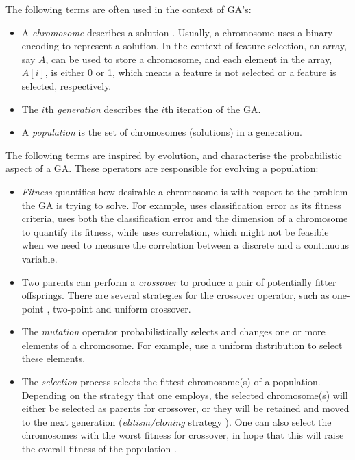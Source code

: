 \documentclass[12pt, twoside, a4paper]{report}
\begin{document}
The following terms are often used in the context of GA's:
\begin{itemize}
  \item A \textit{chromosome} describes a solution \cite{RefWorks:205}. Usually, a chromosome uses a binary encoding to represent a solution. In the context of feature selection, an array, say $A$, can be used to store a chromosome, and each element in the array, $A[i]$, is either 0 or 1, which means a feature is not selected or a feature is selected, respectively.
  
  \item The $i$th \textit{generation} describes the $i$th iteration of the GA.
  
  \item A \textit{population} is the set of chromosomes (solutions) in a generation.
\end{itemize}

The following terms are inspired by evolution, and characterise the probabilistic aspect of a GA. These operators are responsible for evolving a population:
\begin{itemize}
  \item \textit{Fitness} quantifies how desirable a chromosome is with respect to the problem the GA is trying to solve. For example, \cite{RefWorks:204} uses classification error as its fitness criteria, \cite{RefWorks:200} uses both the classification error and the dimension of a chromosome to quantify its fitness, while \cite{RefWorks:201} uses correlation, which might not be feasible when we need to measure the correlation between a discrete and a continuous variable.
  
  \item Two parents can perform a \textit{crossover} to produce a pair of potentially fitter offsprings. There are several strategies for the crossover operator, such as one-point \cite{RefWorks:201}, two-point \cite{RefWorks:202, RefWorks:204} and uniform crossover.
  
  \item The \textit{mutation} operator probabilistically selects and changes one or more elements of a chromosome. For example, \cite{RefWorks:201, RefWorks:204} use a uniform distribution to select these elements.

  \item The \textit{selection} process selects the fittest chromosome(s) of a population. Depending on the strategy that one employs, the selected chromosome(s) will either be selected as parents for crossover, or they will be retained and moved to the next generation (\textit{elitism/cloning}  strategy \cite{RefWorks:202}). One can also select the chromosomes with the worst fitness for crossover, in hope that this will raise the overall fitness of the population \cite{RefWorks:203}.
  
\end{itemize}
\end{document}
